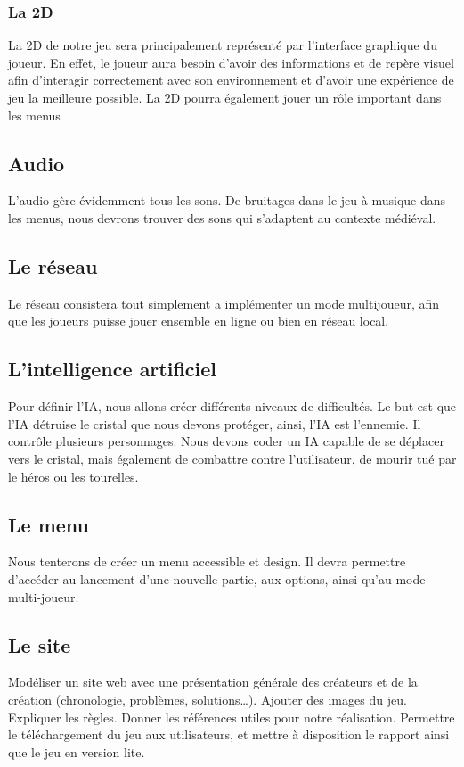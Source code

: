 \documentclass[a4paper, 12pt]{article}
\begin{document}
		\subsubsection{La 2D}
		La 2D de notre jeu sera principalement représenté par l'interface graphique du joueur. En effet, le joueur aura besoin d'avoir des informations et de repère visuel afin d'interagir correctement avec son environnement et d'avoir une expérience de jeu la meilleure possible. La 2D pourra également jouer un rôle important dans les menus
	\subsection{Audio}
	L’audio gère évidemment tous les sons. De bruitages dans le jeu à musique dans les menus, nous devrons trouver des sons qui s’adaptent au contexte médiéval.

	\subsection{Le réseau}
	Le réseau consistera tout simplement a implémenter un mode multijoueur, afin que les joueurs puisse jouer ensemble en ligne ou bien en réseau local.
	\subsection{L'intelligence artificiel}
	Pour définir l’IA, nous allons créer différents niveaux de difficultés. Le but est que l’IA détruise le cristal que nous devons protéger, ainsi, l’IA est l’ennemie. Il contrôle plusieurs personnages. Nous devons coder un IA capable de se déplacer vers le cristal, mais également de combattre contre l’utilisateur, de mourir tué par le héros ou les tourelles. 

	\subsection{Le menu}
	Nous tenterons de créer un menu accessible et design. Il devra permettre d'accéder au lancement d’une nouvelle partie, aux options, ainsi qu’au mode multi-joueur. 
	\subsection{Le site}
	Modéliser un site web avec une présentation générale des créateurs et de la création (chronologie, problèmes, solutions…). Ajouter des images du jeu. Expliquer les règles.  Donner les références utiles pour notre réalisation. Permettre le téléchargement du jeu aux utilisateurs, et mettre à disposition le rapport ainsi que le jeu en version lite.
\end{document}
